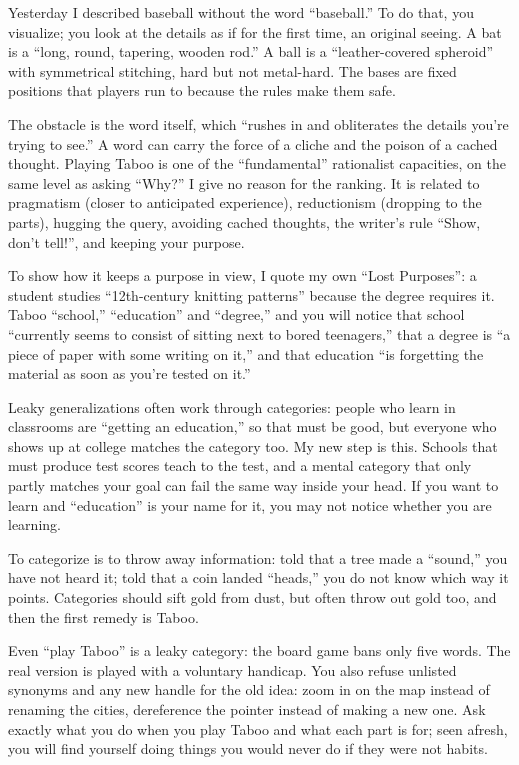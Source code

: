 
Yesterday I described baseball without the word ``baseball.'' To do that, you visualize; you look at the details as if for the first time, an original seeing. A bat is a ``long, round, tapering, wooden rod.'' A ball is a ``leather-covered spheroid'' with symmetrical stitching, hard but not metal-hard. The bases are fixed positions that players run to because the rules make them safe.

The obstacle is the word itself, which ``rushes in and obliterates the details you're trying to see.'' A word can carry the force of a cliche and the poison of a cached thought. Playing Taboo is one of the ``fundamental'' rationalist capacities, on the same level as asking ``Why?'' I give no reason for the ranking. It is related to pragmatism (closer to anticipated experience), reductionism (dropping to the parts), hugging the query, avoiding cached thoughts, the writer's rule ``Show, don't tell!'', and keeping your purpose.

To show how it keeps a purpose in view, I quote my own ``Lost Purposes'': a student studies ``12th-century knitting patterns'' because the degree requires it. Taboo ``school,'' ``education'' and ``degree,'' and you will notice that school ``currently seems to consist of sitting next to bored teenagers,'' that a degree is ``a piece of paper with some writing on it,'' and that education ``is forgetting the material as soon as you're tested on it.''

Leaky generalizations often work through categories: people who learn in classrooms are ``getting an education,'' so that must be good, but everyone who shows up at college matches the category too. My new step is this. Schools that must produce test scores teach to the test, and a mental category that only partly matches your goal can fail the same way inside your head. If you want to learn and ``education'' is your name for it, you may not notice whether you are learning. 

To categorize is to throw away information: told that a tree made a ``sound,'' you have not heard it; told that a coin landed ``heads,'' you do not know which way it points. Categories should sift gold from dust, but often throw out gold too, and then the first remedy is Taboo.

Even ``play Taboo'' is a leaky category: the board game bans only five words. The real version is played with a voluntary handicap. You also refuse unlisted synonyms and any new handle for the old idea: zoom in on the map instead of renaming the cities, dereference the pointer instead of making a new one. Ask exactly what you do when you play Taboo and what each part is for; seen afresh, you will find yourself doing things you would never do if they were not habits.

